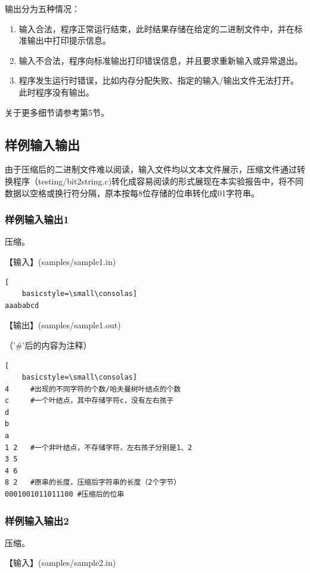 \documentclass{article}
\begin{document}
输出分为五种情况：

\begin{enumerate}
    \item 输入合法，程序正常运行结束，此时结果存储在给定的二进制文件中，并在标准输出中打印提示信息。
    \item 输入不合法，程序向标准输出打印错误信息，并且要求重新输入或异常退出。
    \item 程序发生运行时错误，比如内存分配失败、指定的输入/输出文件无法打开。此时程序没有输出。
\end{enumerate}

关于更多细节请参考第5节。

\subsection{样例输入输出}

由于压缩后的二进制文件难以阅读，输入文件均以文本文件展示，压缩文件通过转换程序（testing/bit2string.c)转化成容易阅读的形式展现在本实验报告中，将不同数据以空格或换行符分隔，原本按每8位存储的位串转化成01字符串。

\subsubsection{样例输入输出1}

压缩。

【输入】(samples/sample1.in)

\begin{lstlisting}[
    basicstyle=\small\consolas]
aaababcd
\end{lstlisting}

【输出】(samples/sample1.out)

（'\#'后的内容为注释）

\begin{lstlisting}[
    basicstyle=\small\consolas]
4     #出现的不同字符的个数/哈夫曼树叶结点的个数
c     #一个叶结点，其中存储字符c，没有左右孩子 
d
b
a
1 2   #一个非叶结点，不存储字符，左右孩子分别是1、2
3 5
4 6
8 2   #原串的长度，压缩后字符串的长度（2个字节）
0001001011011100 #压缩后的位串
\end{lstlisting}

\subsubsection{样例输入输出2}

压缩。

【输入】(samples/sample2.in)
\end{document}
